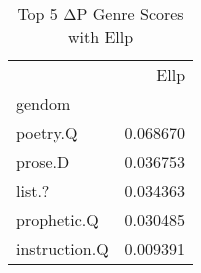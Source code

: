\begin{table}[htbp!]
\centering
\caption{Top 5 ΔP Genre Scores with Ellp}
\label{table:dp_Ellp_genre}
\begin{tabular}{lr}
\toprule
{} &      Ellp \\
gendom        &           \\
\midrule
poetry.Q      &  0.068670 \\
prose.D       &  0.036753 \\
list.?        &  0.034363 \\
prophetic.Q   &  0.030485 \\
instruction.Q &  0.009391 \\
\bottomrule
\end{tabular}
\end{table}
